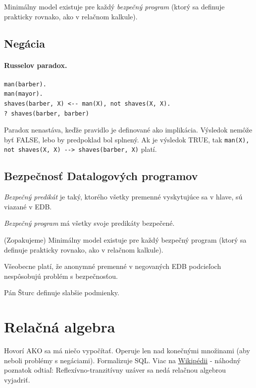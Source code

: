 \documentclass[10pt,a4paper]{article}
\begin{document}
Minimálny model existuje pre každý \emph{bezpečný program} (ktorý sa definuje prakticky rovnako, ako v relačnom kalkule).

\subsection{Negácia}

\paragraph{Russelov paradox.}
\begin{verbatim}
man(barber).
man(mayor).
shaves(barber, X) <-- man(X), not shaves(X, X).
? shaves(barber, barber)
\end{verbatim}

Paradox nenastáva, keďže pravidlo je definované ako implikácia. Výsledok nemôže byť FALSE,
lebo by predpoklad bol splnený. Ak je výsledok TRUE, tak \verb|man(X), not shaves(X, X) --> shaves(barber, X)| platí.

\subsection{Bezpečnosť Datalogových programov}

\emph{Bezpečný predikát} je taký, ktorého všetky premenné vyskytujúce sa v hlave, sú viazané v EDB.

\emph{Bezpečný program} má všetky svoje predikáty bezpečené.

(Zopakujeme) Minimálny model existuje pre každý bezpečný program (ktorý sa definuje prakticky rovnako, ako v relačnom kalkule).

Všeobecne platí, že anonymné premenné v negovaných EDB podcieľoch
nespôsobujú problém s bezpečnosťou.

Pán Šturc definuje slabšie podmienky.

\section{Relačná algebra}
\label{relacna_algebra}

Hovorí AKO sa má niečo vypočítať. Operuje len nad konečnými množinami (aby neboli problémy s negáciami). Formalizuje SQL. Viac na \href{http://en.wikipedia.org/wiki/Relational_algebra}{Wikipédii} - náhodný poznatok odtiaľ: Reflexívno-tranzitívny uzáver sa nedá relačnou algebrou vyjadriť.
\end{document}
